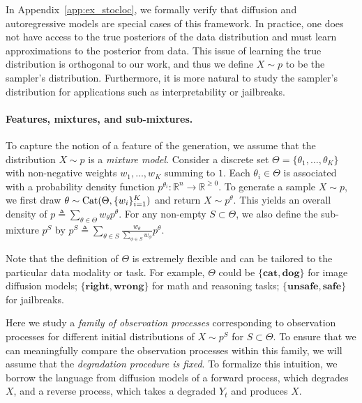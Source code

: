 In Appendix~\ref{app:ex_stocloc}, we formally verify that diffusion and autoregressive models are special cases of this framework. In practice, one does not have access to the true posteriors of the data distribution and must learn approximations to the posterior from data. This issue of learning the true distribution is orthogonal to our work, and thus we define $X \sim p$ to be the sampler's distribution. Furthermore, it is more natural to study the sampler's distribution for applications such as interpretability or jailbreaks. 

\paragraph{Features, mixtures, and sub-mixtures.} \enspace To capture the notion of a feature of the generation, we assume that the distribution $X \sim p$ is a \emph{mixture model}. Consider a discrete set $\Theta=\{\theta_1,\dots,\theta_K\}$ with non-negative weights $w_1,\dots,w_K$ summing to $1$. Each $\theta_i \in \Theta$ is associated with a probability density function $p^{\theta_i}:\mathbb{R}^n \to \mathbb{R}^{\geq 0}$. To generate a sample $X \sim p$, we first draw $\theta \sim \text{Cat}(\Theta,\{w_i\}_{i=1}^K)$ and return $X \sim p^\theta$.  This yields an overall density of $p  \triangleq \sum_{\theta \in \Theta} w_\theta p^\theta$. For any non-empty $S\subset\Theta$, we also define the sub-mixture $p^S$ by $p^S \triangleq \sum_{\theta \in S}\frac{w_\theta}{\sum_{\phi \in S} w_\phi} p^\theta$. 
\begin{remark}
Note that the definition of $\Theta$ is extremely flexible and can be tailored to the particular data modality or task. For example, $\Theta$ could be $\{\textbf{cat}, \textbf{dog}\}$ for image diffusion models; $\{\textbf{right}, \textbf{wrong}\}$ for math and reasoning tasks; $\{\textbf{unsafe}, \textbf{safe}\}$ for jailbreaks. 
\end{remark}

\noindent Here we study a \emph{family of observation processes} corresponding to observation processes for different initial distributions of $X \sim p^S$ for $S \subset \Theta$. To ensure that we can meaningfully compare the observation processes within this family, we will assume that the \emph{degradation procedure is fixed}. To formalize this intuition, we borrow the language from diffusion models of a forward process, which degrades $X$, and a reverse process, which takes a degraded $Y_t$ and produces $X$. 




